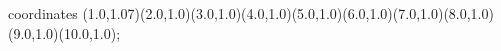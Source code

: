 					coordinates { (1.0,1.07)(2.0,1.0)(3.0,1.0)(4.0,1.0)(5.0,1.0)(6.0,1.0)(7.0,1.0)(8.0,1.0)(9.0,1.0)(10.0,1.0)};
